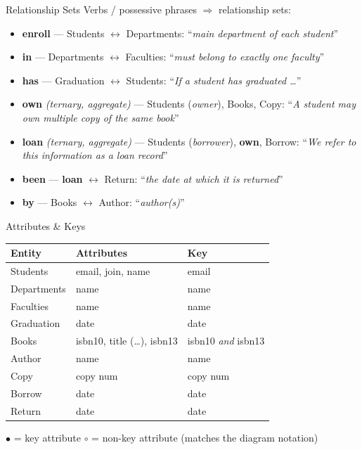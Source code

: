 \documentclass{beamer}
\begin{document}
\begin{frame}{Relationship Sets}
\small
Verbs / possessive phrases $\Rightarrow$ relationship sets:
\begin{itemize}
  \item \textbf{enroll} --- Students $\leftrightarrow$ Departments: ``\textit{main department of each student}''
  \item \textbf{in} --- Departments $\leftrightarrow$ Faculties: ``\textit{must belong to exactly one faculty}''
  \item \textbf{has} --- Graduation $\leftrightarrow$ Students: ``\textit{If a student has graduated \dots}''
  \item \textbf{own} \emph{(ternary, \alert{aggregate})} --- Students (\emph{owner}), Books, Copy: ``\textit{A student may own multiple copy of the same book}''
  \item \textbf{loan} \emph{(ternary, \alert{aggregate})} --- Students (\emph{borrower}), \textbf{own}, Borrow: ``\textit{We refer to this information as a loan record}''
  \item \textbf{been} --- \textbf{loan} $\leftrightarrow$ Return: ``\textit{the date at which it is returned}''
  \item \textbf{by} --- Books $\leftrightarrow$ Author: ``\textit{author(s)}''
\end{itemize}
\end{frame}

\begin{frame}{Attributes \& Keys}
\small
\begin{tabular}{@{}lll@{}}
\toprule
\textbf{Entity} & \textbf{Attributes} & \textbf{Key} \\
\midrule
Students    & email, join, name       & email \\
Departments & name                    & name \\
Faculties   & name                    & name \\
Graduation  & date                    & date \\
Books       & isbn10, title (\dots), isbn13 & isbn10 \emph{and} isbn13 \\
Author      & name                    & name \\
Copy        & copy num                & copy num \\
Borrow      & date                    & date \\
Return      & date                    & date \\
\bottomrule
\end{tabular}
\vspace{0.5em}

{\scriptsize $\bullet$ = key attribute \quad $\circ$ = non-key attribute (matches the diagram notation)}
\end{frame}
\end{document}
